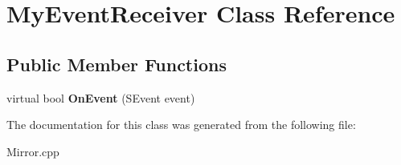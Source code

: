 \hypertarget{class_my_event_receiver}{
\section{MyEventReceiver Class Reference}
\label{class_my_event_receiver}
}
\subsection*{Public Member Functions}
\begin{DoxyCompactItemize}
\item 
\hypertarget{class_my_event_receiver_a5bf7cec70e1b17ec6d2464b33b052c57}{
virtual bool {\bfseries OnEvent} (SEvent event)}
\label{class_my_event_receiver_a5bf7cec70e1b17ec6d2464b33b052c57}

\end{DoxyCompactItemize}


The documentation for this class was generated from the following file:\begin{DoxyCompactItemize}
\item 
Mirror.cpp\end{DoxyCompactItemize}
